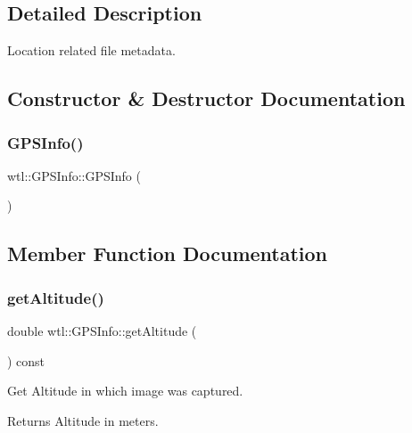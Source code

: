 \subsection{Detailed Description}
Location related file metadata. 

\subsection{Constructor \& Destructor Documentation}
\mbox{\label{classwtl_1_1_g_p_s_info_a7e2bea7fbd2a750d8c1a5d4c490247be}} 
\subsubsection{\texorpdfstring{G\+P\+S\+Info()}{GPSInfo()}}
{\footnotesize\ttfamily wtl\+::\+G\+P\+S\+Info\+::\+G\+P\+S\+Info (\begin{DoxyParamCaption}{ }\end{DoxyParamCaption})}



\subsection{Member Function Documentation}
\mbox{\label{classwtl_1_1_g_p_s_info_aa872765acb42234e9cd95f2caf3b79ca}} 
\subsubsection{\texorpdfstring{get\+Altitude()}{getAltitude()}}
{\footnotesize\ttfamily double wtl\+::\+G\+P\+S\+Info\+::get\+Altitude (\begin{DoxyParamCaption}{ }\end{DoxyParamCaption}) const}



Get Altitude in which image was captured. 

\begin{DoxyReturn}{Returns}
Altitude in meters. 
\end{DoxyReturn}
\mbox{\label{classwtl_1_1_g_p_s_info_aab9f9d61721676df7830d879010edc8b}} 
